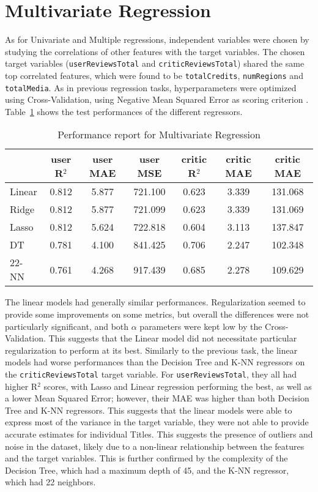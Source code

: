 \section{Multivariate Regression}
As for Univariate and Multiple regressions, independent variables were
chosen by studying the correlations of other features with the target variables.
The chosen target variables (\texttt{userReviewsTotal} and \texttt{criticReviewsTotal})
shared the same top correlated features, which were found to be \texttt{totalCredits},
\texttt{numRegions} and \texttt{totalMedia}.
As in previous regression tasks, hyperparameters were optimized using Cross-Validation,
using Negative Mean Squared Error as scoring criterion .
Table~\ref{tab:multi_regression_report} shows the test performances of the different regressors.
\begin{table}[H]
    \centering
    \begin{tabular}{lccc@{\hskip 30pt}ccc}
        \toprule
         & \textbf{user R$^2$} & \textbf{user MAE} & \textbf{user MSE} & \textbf{critic R$^2$} & \textbf{critic MAE} & \textbf{critic MAE} \\
        \midrule
        Linear & 0.812 & 5.877 & 721.100 & 0.623 & 3.339 & 131.068 \\
        Ridge & 0.812 & 5.877 & 721.099 & 0.623 & 3.339 & 131.069 \\ %
        Lasso & 0.812 & 5.624 & 722.818 & 0.604 & 3.113 & 137.847 \\ %
        DT & 0.781 & 4.100 & 841.425 & 0.706 & 2.247 & 102.348 \\ %
        22-NN & 0.761 & 4.268 & 917.439 & 0.685 & 2.278 & 109.629 \\ %
        \bottomrule
    \end{tabular}
    \caption{Performance report for Multivariate Regression}
    \label{tab:multi_regression_report}
\end{table}

The linear models had generally similar performances. Regularization seemed to provide some improvements
on some metrics, but overall the differences were not particularly significant, and both $\alpha$ parameters
were kept low by the Cross-Validation.
This suggests that the Linear model did not necessitate particular regularization to perform at its best.
Similarly to the previous task, the linear models had worse performances than the Decision Tree and K-NN
regressors on the \texttt{criticReviewsTotal} target variable.
For \texttt{userReviewsTotal}, they all had higher R$^2$ scores, with Lasso and Linear regression
performing the best, as well as a lower Mean Squared Error; however,
their MAE was higher than both Decision Tree and K-NN regressors.
This suggests that the linear models were able to
express most of the variance in the target variable, they were not able to
provide accurate estimates for individual Titles. This suggests the presence of outliers and noise
in the dataset, likely due to a non-linear relationship between the features and the target variables.
This is further confirmed by the complexity of the Decision Tree, which had a maximum depth of 45,
and the K-NN regressor, which had 22 neighbors.